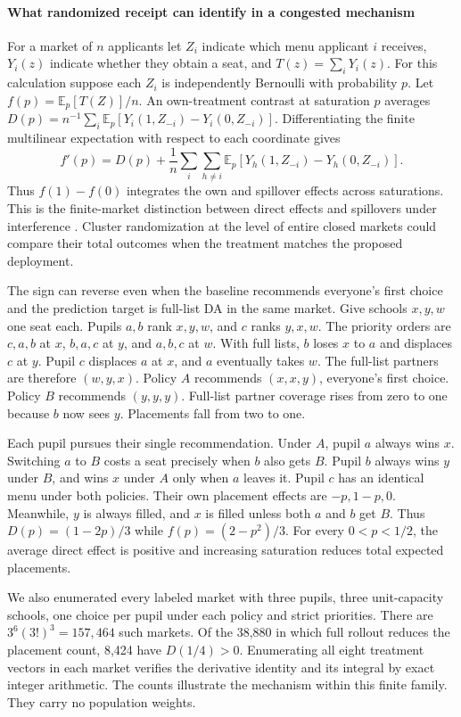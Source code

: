 \paragraph{What randomized receipt can identify in a congested mechanism}
For a market of $n$ applicants let $Z_i$ indicate which menu applicant $i$ receives, $Y_i(z)$ indicate whether they obtain a seat, and $T(z)=\sum_iY_i(z)$. For this calculation suppose each $Z_i$ is independently Bernoulli with probability $p$. Let $f(p)=\mathbb E_p[T(Z)]/n$. An own-treatment contrast at saturation $p$ averages
$D(p)=n^{-1}\sum_i \mathbb E_p[Y_i(1,Z_{-i})-Y_i(0,Z_{-i})]$.
Differentiating the finite multilinear expectation with respect to each coordinate gives
\[
f'(p)=D(p)+\frac{1}{n}\sum_{i}\sum_{h\ne i}
\mathbb E_p[Y_h(1,Z_{-i})-Y_h(0,Z_{-i})].
\]
Thus $f(1)-f(0)$ integrates the own and spillover effects across saturations. This is the finite-market distinction between direct effects and spillovers under interference \citep{munrointerference}. Cluster randomization at the level of entire closed markets could compare their total outcomes when the treatment matches the proposed deployment.

The sign can reverse even when the baseline recommends everyone's first choice and the prediction target is full-list DA in the same market. Give schools $x,y,w$ one seat each. Pupils $a,b$ rank $x,y,w$, and $c$ ranks $y,x,w$. The priority orders are $c,a,b$ at $x$, $b,a,c$ at $y$, and $a,b,c$ at $w$. With full lists, $b$ loses $x$ to $a$ and displaces $c$ at $y$. Pupil $c$ displaces $a$ at $x$, and $a$ eventually takes $w$. The full-list partners are therefore $(w,y,x)$. Policy $A$ recommends $(x,x,y)$, everyone's first choice. Policy $B$ recommends $(y,y,y)$. Full-list partner coverage rises from zero to one because $b$ now sees $y$. Placements fall from two to one.

Each pupil pursues their single recommendation. Under $A$, pupil $a$ always wins $x$. Switching $a$ to $B$ costs a seat precisely when $b$ also gets $B$. Pupil $b$ always wins $y$ under $B$, and wins $x$ under $A$ only when $a$ leaves it. Pupil $c$ has an identical menu under both policies. Their own placement effects are $-p,1-p,0$. Meanwhile, $y$ is always filled, and $x$ is filled unless both $a$ and $b$ get $B$. Thus $D(p)=(1-2p)/3$ while $f(p)=(2-p^2)/3$. For every $0<p<1/2$, the average direct effect is positive and increasing saturation reduces total expected placements.

We also enumerated every labeled market with three pupils, three unit-capacity schools, one choice per pupil under each policy and strict priorities. There are $3^6(3!)^3=157{,}464$ such markets. Of the 38,880 in which full rollout reduces the placement count, 8,424 have $D(1/4)>0$. Enumerating all eight treatment vectors in each market verifies the derivative identity and its integral by exact integer arithmetic. The counts illustrate the mechanism within this finite family. They carry no population weights.

